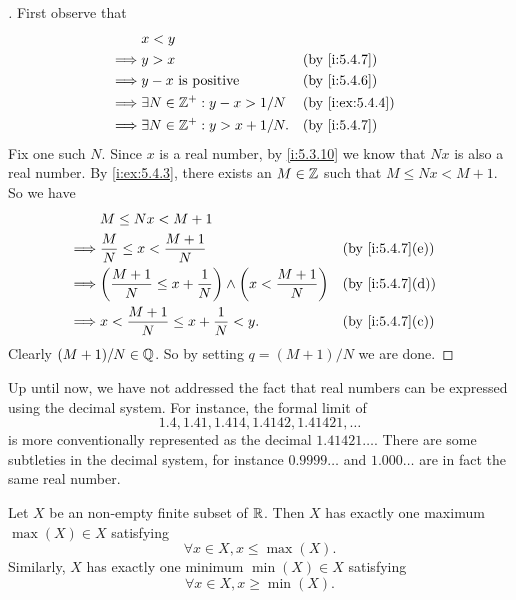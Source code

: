 \begin{proof}[]
  First observe that
  \begin{align*}
             & x < y                                                    \\
    \implies & y > x                               &  & \by{i:5.4.7}    \\
    \implies & y - x \text{ is positive}           &  & \by{i:5.4.6}    \\
    \implies & \exists N \in \Z^+ : y - x > 1 / N  &  & \by{i:ex:5.4.4} \\
    \implies & \exists N \in \Z^+ : y > x + 1 / N. &  & \by{i:5.4.7}
  \end{align*}
  Fix one such \(N\).
  Since \(x\) is a real number, by \cref{i:5.3.10} we know that \(Nx\) is also a real number.
  By \cref{i:ex:5.4.3}, there exists an \(M \in \mathbb{Z}\) such that \(M \leq Nx < M + 1\).
  So we have
  \begin{align*}
             & M \leq Nx < M + 1                                                                                \\
    \implies & \dfrac{M}{N} \leq x < \dfrac{M + 1}{N}                                      &  & \by{i:5.4.7}[e] \\
    \implies & \pa{\dfrac{M + 1}{N} \leq x + \dfrac{1}{N}} \land \pa{x < \dfrac{M + 1}{N}} &  & \by{i:5.4.7}[d] \\
    \implies & x < \dfrac{M + 1}{N} \leq x + \dfrac{1}{N} < y.                             &  & \by{i:5.4.7}[c]
  \end{align*}
  Clearly \((M + 1) / N \in \mathbb{Q}\).
  So by setting \(q = (M + 1) / N\) we are done.
\end{proof}

\begin{rmk}\label{i:5.4.15}
  Up until now, we have not addressed the fact that real numbers can be expressed using the decimal system.
  For instance, the formal limit of
  \[
    1.4, 1.41, 1.414, 1.4142, 1.41421, \dots
  \]
  is more conventionally represented as the decimal \(1.41421\dots\).
  There are some subtleties in the decimal system, for instance \(0.9999\dots\) and \(1.000\dots\) are in fact the same real number.
\end{rmk}

\begin{ac}\label{i:ac:5.4.2}
  Let \(X\) be an non-empty finite subset of \(\mathbb{R}\).
  Then \(X\) has exactly one maximum \(\max(X) \in X\) satisfying
  \[
    \forall x \in X, x \leq \max(X).
  \]
  Similarly, \(X\) has exactly one minimum \(\min(X) \in X\) satisfying
  \[
    \forall x \in X, x \geq \min(X).
  \]
\end{ac}

